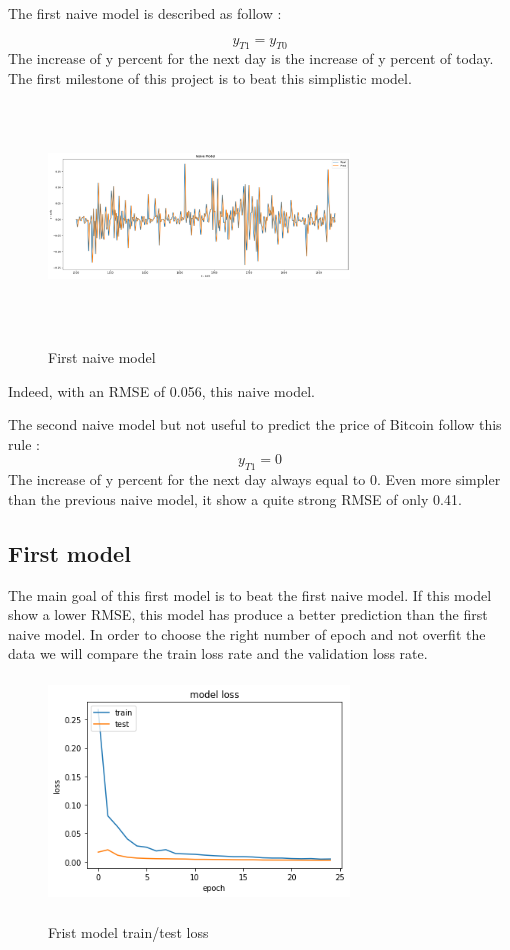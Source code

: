 \documentclass[conference]{IEEEtran}
\begin{document}
The first naive model is described as follow : 

\begin{equation}
y_{T1} = y_{T0}
\end{equation}
The increase of y percent for the next day is the increase of y percent of today. The first milestone of this project is to beat this simplistic model. 
 
\begin{figure}[H]
\includegraphics[width=8cm, height=6cm]{NM_FInal}
	\label{fig}
	\caption{First naive model}
\end{figure}

Indeed, with an RMSE of 0.056, this naive model. 
\newline

The second naive model but not useful to predict the price of Bitcoin follow this rule :
\begin{equation}
y_{T1} = 0
\end{equation}
The increase of y percent for the next day always equal to 0. Even more simpler than the previous naive model, it show a quite strong RMSE of only 0.41.
\newline

\subsection{First model}\label{AA}
The main goal of this first model is to beat the first naive model. If this model show a lower RMSE, this model has produce a better prediction than the first naive model. In order to choose the right number of epoch and not overfit the data we will compare the train loss rate and the validation loss rate.

\begin{figure}[H]
\includegraphics[width=8cm, height=6cm]{M1_loss}
	\label{fig}
	\caption{Frist model train/test loss}
\end{figure}
\end{document}
